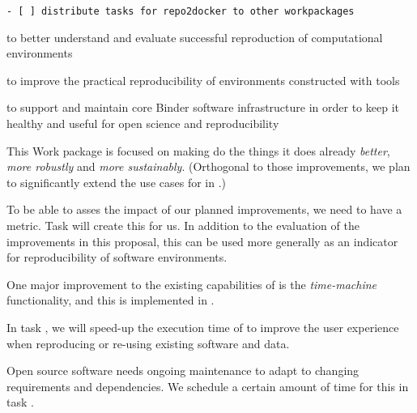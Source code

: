 \begin{draft}
\begin{verbatim}
- [ ] distribute tasks for repo2docker to other workpackages
\end{verbatim}
\end{draft}

\begin{workpackage}[
  id=reproducibility,
  wphases=0-36!1,
  title=Improving robustness of reproducibility tools,
  short=Core,
  lead=QS,
  SRLRM=24,
  UIORM=0,
  MPRM=2,
  QSRM=12,
  swsites,
]
\begin{wpobjectives}
  \begin{compactitem}
    \item to better understand and evaluate successful reproduction of computational environments
    \item to improve the practical reproducibility of environments constructed
      with \TheProject tools
    \item to support and maintain core Binder software infrastructure in order to keep it healthy
         and useful for open science and reproducibility
 \end{compactitem}
\end{wpobjectives}

\begin{wpdescription}

This Work package is focused on making \repotodocker{} do the things it does
already \emph{better}, \emph{more robustly} and \emph{more sustainably}.
(Orthogonal to those improvements, we plan to significantly extend the use cases
for \repotodocker{} in .)

To be able to asses the impact of our planned improvements, we need to have a
metric. Task  will create this
for us. In addition to the evaluation of the improvements in this proposal, this
can be used more generally as an indicator for reproducibility of software
environments.

One major improvement to the existing capabilities of \repotodocker is the
\emph{time-machine} functionality, and this is implemented in .

In task , we will speed-up the execution time of
\repotodocker{} to improve the user experience when reproducing or re-using
existing software and data.

Open source software needs ongoing maintenance to adapt to changing requirements
and dependencies. We schedule a certain amount of time for this in task
.


\end{wpdescription}
\end{workpackage}
